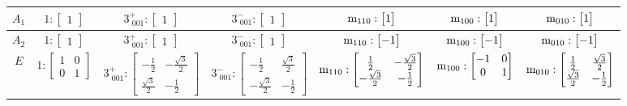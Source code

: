 \documentclass[fleqn,8pt,landscape]{jsarticle}
\begin{document}
\begin{longtable}{ccccccc}
$ A_{1} $ & $ 1:\begin{bmatrix} 1 \end{bmatrix} $ & $ 3^{+}_{\,\,001}:\begin{bmatrix} 1 \end{bmatrix} $ & $ 3^{-}_{\,\,001}:\begin{bmatrix} 1 \end{bmatrix} $ & $ {\rm m}_{110}:\begin{bmatrix} 1 \end{bmatrix} $ & $ {\rm m}_{100}:\begin{bmatrix} 1 \end{bmatrix} $ & $ {\rm m}_{010}:\begin{bmatrix} 1 \end{bmatrix} $ \\ \hline
$ A_{2} $ & $ 1:\begin{bmatrix} 1 \end{bmatrix} $ & $ 3^{+}_{\,\,001}:\begin{bmatrix} 1 \end{bmatrix} $ & $ 3^{-}_{\,\,001}:\begin{bmatrix} 1 \end{bmatrix} $ & $ {\rm m}_{110}:\begin{bmatrix} -1 \end{bmatrix} $ & $ {\rm m}_{100}:\begin{bmatrix} -1 \end{bmatrix} $ & $ {\rm m}_{010}:\begin{bmatrix} -1 \end{bmatrix} $ \\ \hline
$ E $ & $ 1:\begin{bmatrix} 1 & 0 \\ 0 & 1 \end{bmatrix} $ & $ 3^{+}_{\,\,001}:\begin{bmatrix} - \frac{1}{2} & - \frac{\sqrt{3}}{2} \\ \frac{\sqrt{3}}{2} & - \frac{1}{2} \end{bmatrix} $ & $ 3^{-}_{\,\,001}:\begin{bmatrix} - \frac{1}{2} & \frac{\sqrt{3}}{2} \\ - \frac{\sqrt{3}}{2} & - \frac{1}{2} \end{bmatrix} $ & $ {\rm m}_{110}:\begin{bmatrix} \frac{1}{2} & - \frac{\sqrt{3}}{2} \\ - \frac{\sqrt{3}}{2} & - \frac{1}{2} \end{bmatrix} $ & $ {\rm m}_{100}:\begin{bmatrix} -1 & 0 \\ 0 & 1 \end{bmatrix} $ & $ {\rm m}_{010}:\begin{bmatrix} \frac{1}{2} & \frac{\sqrt{3}}{2} \\ \frac{\sqrt{3}}{2} & - \frac{1}{2} \end{bmatrix} $ \\
\end{longtable}
\end{document}
